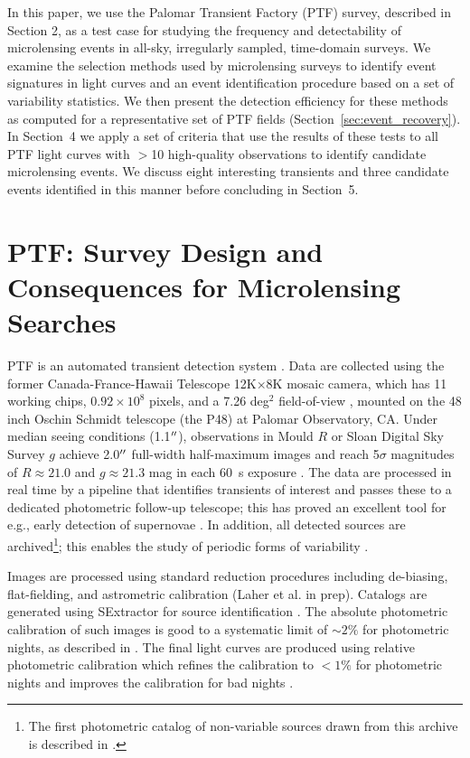 \documentclass{emulateapj}
\begin{document}
In this paper, we use the Palomar Transient Factory (PTF) survey, described in Section 2, as a test case for studying the frequency and detectability of microlensing events in all-sky, irregularly sampled, time-domain surveys. We examine the selection methods used by microlensing surveys to identify event signatures in light curves and an event identification procedure based on a set of variability statistics. We then present the detection efficiency for these methods as computed for a representative set of PTF fields (Section~\ref{sec:event_recovery}). In Section~4 we apply a set of criteria that use the results of these tests to all PTF light curves with $>$10 high-quality observations to identify candidate microlensing events. We discuss eight interesting transients and three candidate events identified in this manner before concluding in Section~5.

\section{PTF: Survey Design and Consequences for Microlensing Searches} 
PTF is an automated transient detection system \citep{nick2009,rau2009}. Data are collected using the former Canada-France-Hawaii Telescope 12K$\times$8K mosaic camera, which has 11 working chips, $0.92\times10^8$ pixels, and a 7.26 deg$^2$ field-of-view \citep{rahmer2008}, mounted on the 48 inch Oschin Schmidt telescope (the P48) at Palomar Observatory, CA. Under median seeing conditions (1.1$\mbox{$^{\prime\prime}$}$), observations in Mould $R$ or Sloan Digital Sky Survey $g$ \citep[SDSS;][]{york00} achieve 2.0$\mbox{$^{\prime\prime}$}$ full-width half-maximum images and reach 5$\sigma$ magnitudes of $R \approx 21.0$ and $g \approx 21.3$ mag in each 60~s exposure \citep{nick2010}. The data are processed in real time by a pipeline that identifies transients of interest and passes these to a dedicated photometric follow-up telescope; this has proved an excellent tool for e.g., early detection of supernovae \citep{nugent2011}. In addition, all detected sources are archived\footnote{The first photometric catalog of non-variable sources drawn from this archive is described in \citet[][]{ofek2012}.}; this enables the study of periodic forms of variability \citep[e.g., stellar or asteroid rotation;][]{agueros11,polishook2012}. 

Images are processed using standard reduction procedures including de-biasing, flat-fielding, and astrometric calibration (Laher et al. in prep). Catalogs are generated using SExtractor for source identification \citep{bertin96}. The absolute photometric calibration of such images is good to a systematic limit of $\sim2\%$ for photometric nights, as described in \cite{ofek2012}. The final light curves are produced using relative photometric calibration which refines the calibration to $<1\%$ for photometric nights and improves the calibration for bad nights \citep[Levitan et al., in prep; for algorithm details see][]{ofek2012, levitan2011}.
\end{document}
